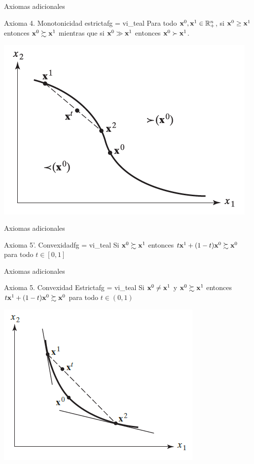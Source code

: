\documentclass[10pt,aspectratio=169]{beamer}  %
\begin{document}
\begin{frame}{Axiomas adicionales}
	\begin{varblock}{Axioma 4. Monotonicidad estricta}{fg = vi_teal}
    \vsf
      Para todo $\mathbf{x}^0, \mathbf{x}^1 \in \mathbb{R}^{n}_{+}$, si $\mathbf{x}^0 \geq \mathbf{x}^1$ entonces $\mathbf{x}^0 \succsim \mathbf{x}^1$ mientras que 
      si $\mathbf{x}^0 \gg \mathbf{x}^1$ entonces $\mathbf{x}^0 \succ \mathbf{x}^1$.
    \vsf
  \end{varblock}
  \pause
  \centering
  \includegraphics[scale=.50]{images/fig1.5.png}

\end{frame}

\begin{frame}{Axiomas adicionales}
	\begin{varblock}{Axioma 5'. Convexidad}{fg = vi_teal}
    \vsf
    Si  $\mathbf{x}^0 \succsim \mathbf{x}^1$ entonces $t \mathbf{x}^1 + (1-t) \mathbf{x}^0 \succsim \mathbf{x}^0 $ para todo $t \in [0,1]$
    \vsf
  \end{varblock}

\end{frame}

\begin{frame}{Axiomas adicionales}
	\begin{varblock}{Axioma 5. Convexidad Estricta}{fg = vi_teal}
    \vsf
    Si  $\mathbf{x}^0 \neq  \mathbf{x}^1$ y $\mathbf{x}^0 \succsim \mathbf{x}^1$ entonces $t \mathbf{x}^1 + (1-t) \mathbf{x}^0 \succsim \mathbf{x}^0 $ para todo $t \in (0,1)$
    \vsf
  \end{varblock}
  \pause
  \centering
  \includegraphics[scale=.60]{images/fig1.6.png}

\end{frame}
\end{document}
